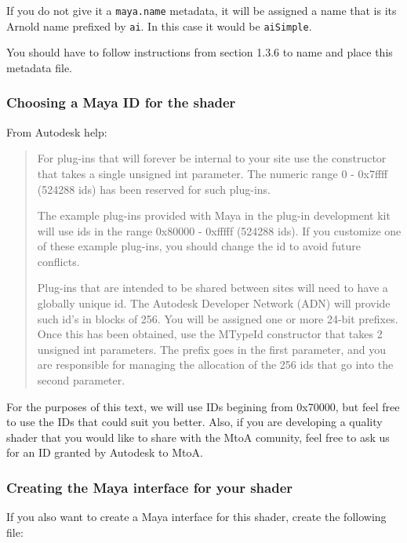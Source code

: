 \inputminted[mathescape,
linenos,
numbersep=5pt,
frame=lines,
framesep=2mm,
baselinestretch=1,
fontsize=\footnotesize,
tabsize=3,
label=simpleShader.mtd]
{mtd}{simpleShader.mtd}

If you do not give it a \texttt{maya.name} metadata, it will be assigned a name that is its Arnold name prefixed by \texttt{ai}. In this case it would be \texttt{aiSimple}.

You should have to follow instructions from section 1.3.6 to name and place this metadata file.


\subsubsection{Choosing a Maya ID for the shader}

From Autodesk help:

\begin{quotation}
For plug-ins that will forever be internal to your site use the
constructor that takes a single unsigned int parameter. The numeric
range 0 - 0x7ffff (524288 ids) has been reserved for such plug-ins.

The example plug-ins provided with Maya in the plug-in development kit
will use ids in the range 0x80000 - 0xfffff (524288 ids). If you
customize one of these example plug-ins, you should change the id to
avoid future conflicts.

Plug-ins that are intended to be shared between sites will need to
have a globally unique id. The Autodesk Developer Network (ADN) will
provide such id's in blocks of 256. You will be assigned one or more
24-bit prefixes. Once this has been obtained, use the MTypeId
constructor that takes 2 unsigned int parameters. The prefix goes in
the first parameter, and you are responsible for managing the
allocation of the 256 ids that go into the second parameter.
\end{quotation}

For the purposes of this text, we will use IDs begining from 0x70000,
but feel free to use the IDs that could suit you better.
Also, if you are developing a quality shader that you would like to share with the MtoA comunity, feel free to ask us for an ID granted by Autodesk to MtoA.

\subsubsection{Creating the Maya interface for your shader}

If you also want to create a Maya interface for this shader, create the following file:\\

